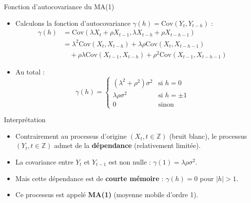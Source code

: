 \documentclass[11pt,aspectratio=169]{beamer}
\newcommand{\Cov}{\mathrm{Cov}}
\newcommand{\Z}{\mathbb{Z}}
\begin{document}
\begin{frame}{Fonction d'autocovariance du MA(1)}

\begin{itemize}

\item Calculons la fonction d'autocovariance $\gamma(h) = \Cov(Y_t, Y_{t-h})$ :
  \begin{align*}
  \gamma(h) &= \Cov(\lambda X_t + \rho X_{t-1}, \lambda X_{t-h} + \rho X_{t-h-1}) \\
  &= \lambda^2 \Cov(X_t, X_{t-h}) + \lambda\rho \Cov(X_t, X_{t-h-1}) \\
  &\quad + \rho\lambda \Cov(X_{t-1}, X_{t-h}) + \rho^2 \Cov(X_{t-1}, X_{t-h-1})
  \end{align*}\newline

\item Au total :
  \[
  \gamma(h) = \begin{cases}
  (\lambda^2 + \rho^2)\sigma^2 & \text{si } h = 0 \\
  \lambda\rho\sigma^2 & \text{si } h = \pm 1 \\
  0 & \text{sinon}
  \end{cases}
  \]

\end{itemize}

\end{frame}

\begin{frame}{Interprétation}

\begin{itemize}

\item Contrairement au processus d'origine $(X_t, t \in \Z)$ (bruit blanc), le processus $(Y_t, t \in \Z)$ admet de la \textbf{dépendance} (relativement limitée).\newline

\item La covariance entre $Y_t$ et $Y_{t-1}$ est non nulle : $\gamma(1) = \lambda\rho\sigma^2$.\newline

\item Mais cette dépendance est de \textbf{courte mémoire} : $\gamma(h) = 0$ pour $|h| > 1$.\newline

\item Ce processus est appelé \textbf{MA(1)} (moyenne mobile d'ordre 1).

\end{itemize}

\end{frame}
\end{document}
